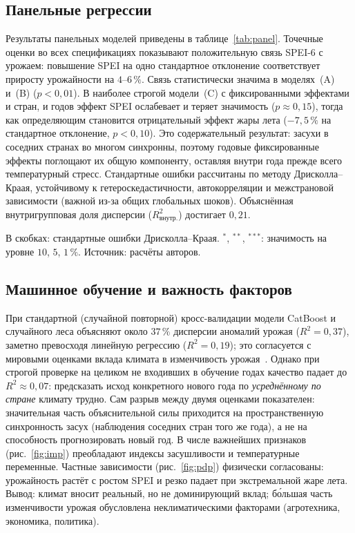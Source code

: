 \documentclass[14pt,a4paper]{extarticle}
\begin{document}
\subsection{Панельные регрессии}

Результаты панельных моделей приведены в таблице~\ref{tab:panel}. Точечные оценки во всех спецификациях показывают положительную связь SPEI-6 с урожаем: повышение SPEI на одно стандартное отклонение соответствует приросту урожайности на $4$--$6\,\%$. Связь статистически значима в моделях~(A) и~(B) ($p<0{,}01$). В наиболее строгой модели~(C) с фиксированными эффектами и стран, и годов эффект SPEI ослабевает и теряет значимость ($p\approx0{,}15$), тогда как определяющим становится отрицательный эффект жары лета ($-7{,}5\,\%$ на стандартное отклонение, $p<0{,}10$). Это содержательный результат: засухи в соседних странах во многом синхронны, поэтому годовые фиксированные эффекты поглощают их общую компоненту, оставляя внутри года прежде всего температурный стресс. Стандартные ошибки рассчитаны по методу Дрисколла–Краая, устойчивому к гетероскедастичности, автокорреляции и межстрановой зависимости (важной из-за общих глобальных шоков). Объяснённая внутригрупповая доля дисперсии ($R^2_{\text{внутр.}}$) достигает $0{,}21$.

\begin{table}[H]
\caption{Панельные регрессии аномалии урожайности (зависимая переменная: аномалия урожая, \%)}
\label{tab:panel}
\centering


\smallskip
\footnotesize В скобках: стандартные ошибки Дрисколла–Краая. $^{*}$, $^{**}$, $^{***}$: значимость на уровне $10$, $5$, $1\,\%$. Источник: расчёты авторов.
\end{table}

\subsection{Машинное обучение и важность факторов}

При стандартной (случайной повторной) кросс-валидации модели CatBoost и случайного леса объясняют около $37\,\%$ дисперсии аномалий урожая ($R^2=0{,}37$), заметно превосходя линейную регрессию ($R^2=0{,}19$); это согласуется с мировыми оценками вклада климата в изменчивость урожая~\cite{ray2015}. Однако при строгой проверке на целиком не входивших в обучение годах качество падает до $R^2\approx0{,}07$: предсказать исход конкретного нового года по \emph{усреднённому по стране} климату трудно. Сам разрыв между двумя оценками показателен: значительная часть объяснительной силы приходится на пространственную синхронность засух (наблюдения соседних стран того же года), а не на способность прогнозировать новый год. В числе важнейших признаков (рис.~\ref{fig:imp}) преобладают индексы засушливости и температурные переменные. Частные зависимости (рис.~\ref{fig:pdp}) физически согласованы: урожайность растёт с ростом SPEI и резко падает при экстремальной жаре лета. Вывод: климат вносит реальный, но не доминирующий вклад; бо́льшая часть изменчивости урожая обусловлена неклиматическими факторами (агротехника, экономика, политика).
\end{document}
